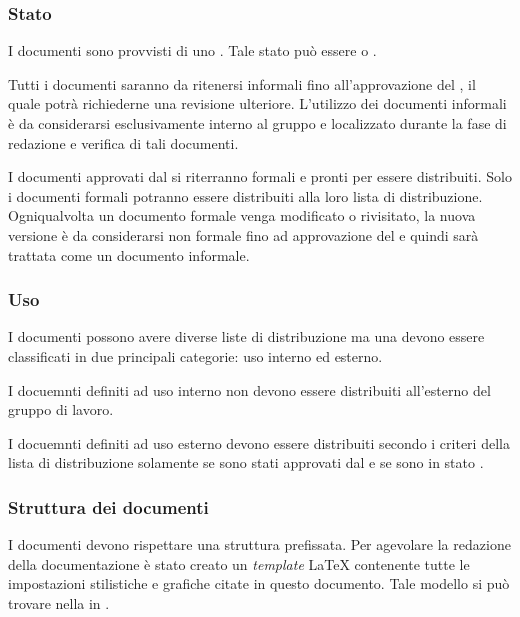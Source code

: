 \documentclass[12pt,a4paper]{article}
\begin{document}
\subsubsection{Stato}
I documenti sono provvisti di uno . Tale stato può essere  o  .

Tutti i documenti saranno da ritenersi informali fino all'approvazione del \PM, il quale potrà richiederne una revisione ulteriore. L'utilizzo dei documenti informali è da considerarsi esclusivamente interno al gruppo e localizzato durante la fase di redazione e verifica di tali documenti.

I documenti approvati dal \PM{} si riterranno formali e pronti per essere distribuiti. Solo i documenti formali potranno essere distribuiti alla loro lista di distribuzione. Ogniqualvolta un documento formale venga modificato o rivisitato, la nuova versione è da considerarsi non formale fino ad approvazione del \PM e quindi sarà trattata come un documento informale.

\subsubsection{Uso}
I documenti possono avere diverse liste di distribuzione ma una devono essere classificati in due principali categorie: uso interno ed esterno.

I docuemnti definiti ad uso interno non devono essere distribuiti all'esterno del gruppo di lavoro.

I docuemnti definiti ad uso esterno devono essere distribuiti secondo i criteri della lista di distribuzione solamente se sono stati approvati dal \PM{} e se sono in stato .

\subsubsection{Struttura dei documenti}
I documenti devono rispettare una struttura prefissata. Per agevolare la redazione della documentazione è stato creato un \emph{template} \LaTeX{} contenente tutte le impostazioni stilistiche e grafiche citate in questo documento. Tale modello si può trovare nella  in .
\end{document}

